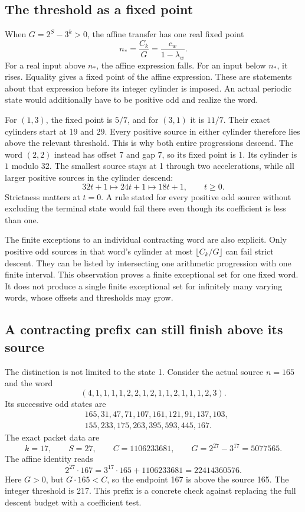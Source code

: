 \subsection{The threshold as a fixed point}
When $G=2^S-3^k>0$, the affine transfer has one real fixed point
\[
n_* = \frac{C_k}{G}=\frac{c_w}{1-\lambda_w}.
\]
For a real input above $n_*$, the affine expression falls. For an input below $n_*$, it rises. Equality gives a fixed point of the affine expression. These are statements about that expression before its integer cylinder is imposed. An actual periodic state would additionally have to be positive odd and realize the word.

For $(1,3)$, the fixed point is $5/7$, and for $(3,1)$ it is $11/7$. Their exact cylinders start at 19 and 29. Every positive source in either cylinder therefore lies above the relevant threshold. This is why both entire progressions descend. The word $(2,2)$ instead has offset 7 and gap 7, so its fixed point is 1. Its cylinder is $1$ modulo 32. The smallest source stays at 1 through two accelerations, while all larger positive sources in the cylinder descend:
\[
32t+1\longmapsto24t+1\longmapsto18t+1,
\qquad t\ge0.
\]
Strictness matters at $t=0$. A rule stated for every positive odd source without excluding the terminal state would fail there even though its coefficient is less than one.

The finite exceptions to an individual contracting word are also explicit. Only positive odd sources in that word's cylinder at most $\lfloor C_k/G\rfloor$ can fail strict descent. They can be listed by intersecting one arithmetic progression with one finite interval. This observation proves a finite exceptional set for one fixed word. It does not produce a single finite exceptional set for infinitely many varying words, whose offsets and thresholds may grow.

\subsection{A contracting prefix can still finish above its source}
The distinction is not limited to the state 1. Consider the actual source $n=165$ and the word
\[
(4,1,1,1,1,2,2,1,2,1,1,2,1,1,1,2,3).
\]
Its successive odd states are
\begin{align*}
&165,31,47,71,107,161,121,91,137,103,\\
&155,233,175,263,395,593,445,167.
\end{align*}
The exact packet data are
\[
k=17,\qquad S=27,\qquad C=1106233681,\qquad
G=2^{27}-3^{17}=5077565.
\]
The affine identity reads
\[
2^{27}\cdot167=3^{17}\cdot165+1106233681=22414360576.
\]
Here $G>0$, but $G\cdot165<C$, so the endpoint 167 is above the source 165. The integer threshold is 217. This prefix is a concrete check against replacing the full descent budget with a coefficient test.

